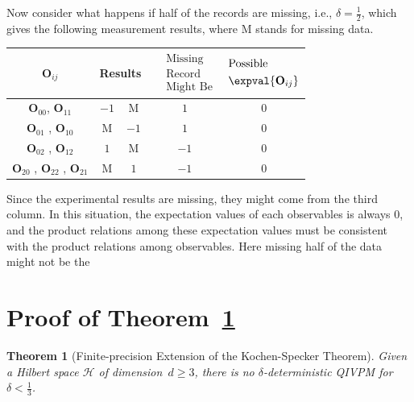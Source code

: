 \documentclass[english,reprint, aps, prl,superscriptaddress, showpacs,
showkeys, longbibliography, amsmath, amssymb, floatfix]{revtex4-1}
\theoremstyle{plain}
\newtheorem{thm}{Theorem}
\theoremstyle{definition}
\newcommand{\Hilb}{\mathcal{H}}
\newcommand{\missing}{\text{M}}
\begin{document}
Now consider what happens if half of the records are missing, i.e.,
$\delta=\frac{1}{2}$, which gives the following measurement results,
where $\missing$ stands for missing data.
\begin{center}
\begin{tabular}{ccccc}
\toprule 
\addlinespace
$\mathbf{O}_{ij}$  & \multicolumn{2}{c}{Results} & $\begin{aligned} & \textrm{Missing}\\
 & \textrm{Record}\\
 & \textrm{Might Be}
\end{aligned}
$ & $\begin{aligned} & \textrm{Possible}\\
 & \expval{\mathbf{O}_{ij}}
\end{aligned}
$\tabularnewline
\midrule
\midrule 
\addlinespace
$\mathbf{O}_{00}$, $\mathbf{O}_{11}$ & $-1$ & $\missing$ & $1$ & $0$\tabularnewline
\midrule 
\addlinespace
$\mathbf{O}_{01}$ , $\mathbf{O}_{10}$  & $\missing$ & $-1$ & $1$ & $0$\tabularnewline
\midrule 
\addlinespace
$\mathbf{O}_{02}$ , $\mathbf{O}_{12}$ & $1$ & $\missing$ & $-1$ & $0$\tabularnewline
\midrule 
\addlinespace
$\mathbf{O}_{20}$ , $\mathbf{O}_{22}$ , $\mathbf{O}_{21}$  & $\missing$ & $1$ & $-1$ & $0$\tabularnewline
\bottomrule
\end{tabular}
\par\end{center}

\noindent Since the experimental results are missing, they might come
from the third column. In this situation, the expectation values of
each observables is always $0$, and the product relations among these
expectation values must be consistent with the product relations among
observables. Here missing half of the data might not be the 





\appendix

\section{\label{sec:Proof-of-Theorem}Proof of Theorem~\ref{cor:Kochen-Specker-IVPM}}

\begin{thm}[Finite-precision Extension of the Kochen-Specker Theorem]
\label{cor:Kochen-Specker-IVPM} Given a Hilbert space $\Hilb$ of
dimension~$d\ge3$, there is no $\delta$-deterministic QIVPM for
$\delta<\frac{1}{3}$.\end{thm}
\end{document}
